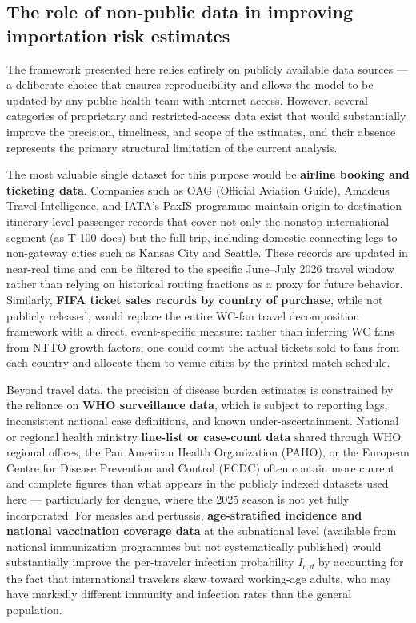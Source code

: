 \documentclass[12pt]{article}
\begin{document}
\subsection*{The role of non-public data in improving importation risk estimates}

The framework presented here relies entirely on publicly available
data sources --- a deliberate choice that ensures reproducibility and
allows the model to be updated by any public health team with internet
access. However, several categories of proprietary and restricted-access
data exist that would substantially improve the precision, timeliness,
and scope of the estimates, and their absence represents the primary
structural limitation of the current analysis.

The most valuable single dataset for this purpose would be
\textbf{airline booking and ticketing data}. Companies such as OAG
(Official Aviation Guide), Amadeus Travel Intelligence, and IATA's
PaxIS programme maintain origin-to-destination itinerary-level passenger
records that cover not only the nonstop international segment (as T-100
does) but the full trip, including domestic connecting legs to non-gateway
cities such as Kansas City and Seattle. These records are updated in
near-real time and can be filtered to the specific June--July 2026 travel
window rather than relying on historical routing fractions as a proxy for
future behavior. Similarly, \textbf{FIFA ticket sales records by country
of purchase}, while not publicly released, would replace the entire
WC-fan travel decomposition framework with a direct, event-specific
measure: rather than inferring WC fans from NTTO growth factors,
one could count the actual tickets sold to fans from each country and
allocate them to venue cities by the printed match schedule.

Beyond travel data, the precision of disease burden estimates is
constrained by the reliance on \textbf{WHO surveillance data}, which is
subject to reporting lags, inconsistent national case definitions, and
known under-ascertainment. National or regional health ministry
\textbf{line-list or case-count data} shared through WHO regional offices,
the Pan American Health Organization (PAHO), or the European Centre for
Disease Prevention and Control (ECDC) often contain more current and
complete figures than what appears in the publicly indexed datasets used
here --- particularly for dengue, where the 2025 season is not yet fully
incorporated. For measles and pertussis, \textbf{age-stratified incidence
and national vaccination coverage data} at the subnational level (available
from national immunization programmes but not systematically published)
would substantially improve the per-traveler infection probability
$I_{c,d}$ by accounting for the fact that international travelers skew
toward working-age adults, who may have markedly different immunity and
infection rates than the general population.
\end{document}
